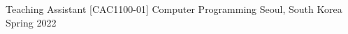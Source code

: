 

\begin{cventries}

  \cventry
    {Teaching Assistant} %
    {[CAC1100-01] Computer Programming} %
    {Seoul, South Korea} %
    {Spring 2022} %
    {}

\end{cventries}
